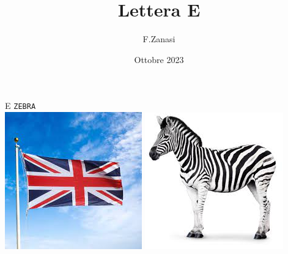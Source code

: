 \documentclass[]{article}
\title{Lettera E}
\author{F.Zanasi}
\date{Ottobre 2023}
\begin{document}
{\fontsize{150}{160}\selectfont E} 
\hspace{2.0in}
{\fontsize{80}{80}\color{black}\texttt{Z}\color{blue}\texttt{E}\color{black}\texttt{BRA}} 
\\[1cm]
\includegraphics[scale=0.3]{flag-UK}
\includegraphics[scale=0.4]{zebra}
\end{document}
